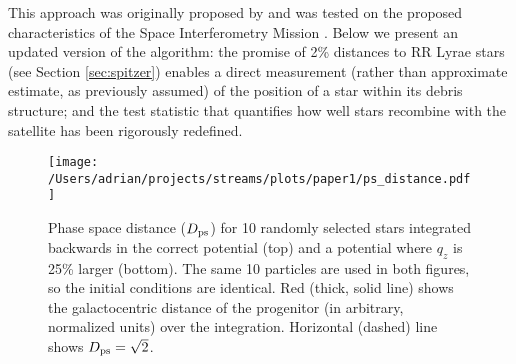\documentclass{emulateapj}
\begin{document}
This approach was originally proposed by \citet{johnston99a} and was tested on the proposed characteristics of the Space
Interferometry Mission \citep{unwin08}. Below we present an updated version of the algorithm:
the promise of 2\% distances to RR Lyrae stars (see Section
\ref{sec:spitzer}) enables a direct measurement (rather than
approximate estimate, as previously assumed) of the position of a star within its debris
structure; and the test statistic that quantifies how well stars recombine
with the satellite has been rigorously redefined.

\begin{figure}[h]
\begin{center}
\texttt{[image: /Users/adrian/projects/streams/plots/paper1/ps\_distance.pdf]}
\caption{Phase space distance ($D_{\rm ps}$) for 10 randomly selected stars integrated backwards in the correct potential (top) and a potential where $q_z$ is 25\% larger (bottom). The same 10 particles are used in both figures, so the initial conditions are identical. Red (thick, solid line) shows the galactocentric distance of the progenitor (in arbitrary, normalized units) over the integration. Horizontal (dashed) line shows $D_{\rm ps}=\sqrt{2}$.}\label{fig:ps_distance}
\end{center}
\end{figure}
\end{document}
